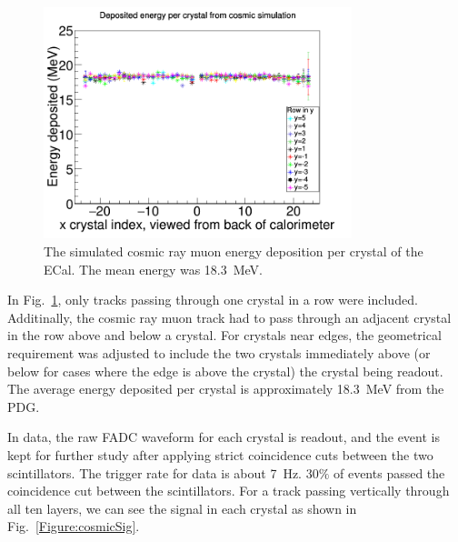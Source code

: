 \begin{figure}[H]
  \centering
      \includegraphics[width=0.8\textwidth]{pics/performance/cosmicEdep.png}
  \caption[Simulation of energy deposited per ECal module from cosmic rays]{The simulated cosmic ray muon energy deposition per crystal of the ECal. The mean energy was 18.3~MeV.}
  \label{Figure:cosmicEdep}
\end{figure}

In Fig.~\ref{Figure:cosmicEdep}, only tracks passing through one crystal in a row were included. Additinally, the cosmic ray muon track had to pass through an adjacent crystal in the row above and below a crystal. For crystals near edges, the geometrical requirement was adjusted to include the two crystals immediately above (or below for cases where the edge is above the crystal) the crystal being readout. The average energy deposited per crystal is approximately 18.3~MeV from the PDG. 

In data, the raw FADC waveform for each crystal is readout, and the event is kept for further study after applying strict coincidence cuts between the two scintillators. The trigger rate for data is about 7~Hz. 30$\%$ of events passed the coincidence cut between the scintillators. For a track passing vertically through all ten layers, we can see the signal in each crystal as shown in Fig.~\ref{Figure:cosmicSig}.

